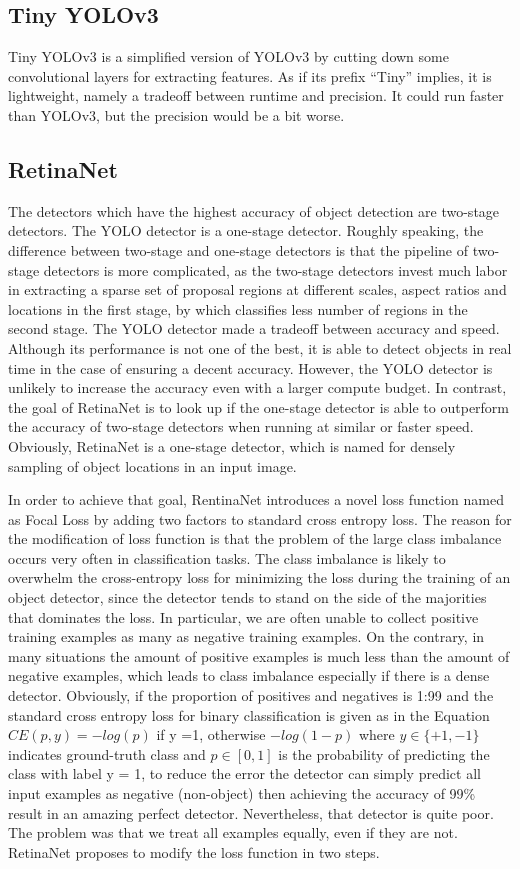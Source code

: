 \documentclass[runningheads]{llncs}
\begin{document}
\subsection{Tiny YOLOv3}
Tiny YOLOv3 is a simplified version of YOLOv3 by cutting down some convolutional layers for extracting features. As if its prefix “Tiny” implies, it is lightweight, namely a tradeoff between runtime and precision. It could run faster than YOLOv3, but the precision would be a bit worse. 

\subsection{RetinaNet}
The detectors which have the highest accuracy of object detection are two-stage detectors. The YOLO detector is a one-stage detector. Roughly speaking, the difference between two-stage and one-stage detectors is that the pipeline of two-stage detectors is more complicated, as the two-stage detectors invest much labor in extracting a sparse set of proposal regions at different scales, aspect ratios and locations in the first stage, by which classifies less number of regions in the second stage. The YOLO detector made a tradeoff between accuracy and speed. Although its performance is not one of the best, it is able to detect objects in real time in the case of ensuring a decent accuracy. However, the YOLO detector is unlikely to increase the accuracy even with a larger compute budget. In contrast, the goal of RetinaNet is to look up if the one-stage detector is able to outperform the accuracy of two-stage detectors when running at similar or faster speed. Obviously, RetinaNet is a one-stage detector, which is named for densely sampling of object locations in an input image. 

In order to achieve that goal, RentinaNet introduces a novel loss function named as Focal Loss by adding two factors to standard cross entropy loss. The reason for the modification of loss function is that the problem of the large class imbalance occurs very often in classification tasks. The class imbalance is likely to overwhelm the cross-entropy loss for minimizing the loss during the training of an object detector, since the detector tends to stand on the side of the majorities that dominates the loss. In particular, we are often unable to collect positive training examples as many as negative training examples. On the contrary, in many situations the amount of positive examples is much less than the amount of negative examples, which leads to class imbalance especially if there is a dense detector. Obviously, if the proportion of positives and negatives is 1:99 and the standard cross entropy loss for binary classification is given as in the Equation $CE(p,y) = -log(p)$ if y =1, otherwise $-log(1-p)$ where $y \in \{+1, -1\}$ indicates ground-truth class and $p \in [0,1]$ is the probability of predicting the class with label y = 1, to reduce the error the detector can simply predict all input examples as negative (non-object) then achieving the accuracy of 99\% result in an amazing perfect detector. Nevertheless, that detector is quite poor. The problem was that we treat all examples equally, even if they are not. RetinaNet proposes to modify the loss function in two steps.
\end{document}
